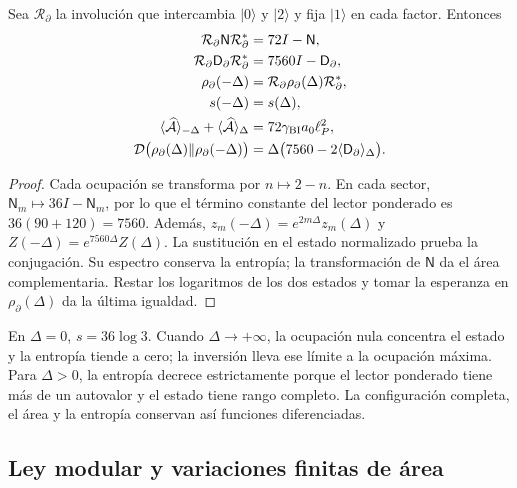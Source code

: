 \begin{theorem}
\label{vii:thm:inversion-sectorial}
Sea \(\mathcal R_\partial\) la involución que intercambia
\(|0\rangle\) y \(|2\rangle\) y fija \(|1\rangle\) en cada
factor. Entonces
\begin{align}
 \mathcal R_\partial\mathsf N\mathcal R_\partial^*&=72I-\mathsf N,\\
 \mathcal R_\partial\mathsf D_\partial\mathcal R_\partial^*
 &=7560I-\mathsf D_\partial,\\
 \rho_\partial(-\Delta)&=\mathcal R_\partial\rho_\partial(\Delta)
                          \mathcal R_\partial^*,\\
 s(-\Delta)&=s(\Delta),\\
 \langle\widehat{\mathcal A}\rangle_{-\Delta}
 +\langle\widehat{\mathcal A}\rangle_\Delta
 &=72\gamma_{\rm BI}a_0\ell_P^2,\\
 \mathcal D\bigl(\rho_\partial(\Delta)\Vert\rho_\partial(-\Delta)\bigr)
 &=\Delta\bigl(7560-2\langle\mathsf D_\partial\rangle_\Delta\bigr).
 \label{vii:eq:inversion-sectorial}
\end{align}
\end{theorem}
\begin{proof}
Cada ocupación se transforma por \(n\mapsto2-n\). En cada sector,
\(\mathsf N_m\mapsto36I-\mathsf N_m\), por lo que el término
constante del lector ponderado es \(36(90+120)=7560\).
Además, \(z_m(-\Delta)=e^{2m\Delta}z_m(\Delta)\) y
\(Z(-\Delta)=e^{7560\Delta}Z(\Delta)\). La sustitución en el
estado normalizado prueba la conjugación. Su espectro conserva la entropía;
la transformación de \(\mathsf N\) da el área complementaria. Restar
los logaritmos de los dos estados y tomar la esperanza en
\(\rho_\partial(\Delta)\) da la última igualdad.
\end{proof}

En \(\Delta=0\), \(s=36\log3\). Cuando \(\Delta\to+\infty\),
la ocupación nula concentra el estado y la entropía tiende a cero;
la inversión lleva ese límite a la ocupación máxima. Para \(\Delta>0\),
la entropía decrece estrictamente porque el lector ponderado tiene más
de un autovalor y el estado tiene rango completo. La configuración
completa, el área y la entropía conservan así funciones diferenciadas.

\subsection{Ley modular y variaciones finitas de área}
\label{vii:subsec:ley-modular-finita}

